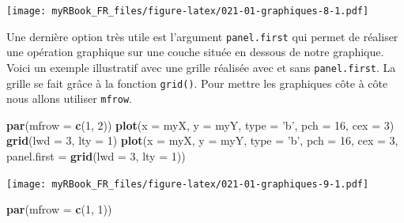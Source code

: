\documentclass[]{book}
\newenvironment{Shaded}{\begin{snugshade}}{\end{snugshade}}
\newcommand{\DataTypeTok}[1]{\textcolor[rgb]{0.13,0.29,0.53}{#1}}
\newcommand{\DecValTok}[1]{\textcolor[rgb]{0.00,0.00,0.81}{#1}}
\newcommand{\KeywordTok}[1]{\textcolor[rgb]{0.13,0.29,0.53}{\textbf{#1}}}
\newcommand{\NormalTok}[1]{#1}
\newcommand{\StringTok}[1]{\textcolor[rgb]{0.31,0.60,0.02}{#1}}
\begin{document}
\texttt{[image: myRBook\_FR\_files/figure-latex/021-01-graphiques-8-1.pdf]}

Une dernière option très utile est l'argument \texttt{panel.first} qui permet de réaliser une opération graphique sur une couche située en dessous de notre graphique. Voici un exemple illustratif avec une grille réalisée avec et sans \texttt{panel.first}. La grille se fait grâce à la fonction \texttt{grid()}. Pour mettre les graphiques côte à côte nous allons utiliser \texttt{mfrow}.

\begin{Shaded}
\begin{Highlighting}[]
\KeywordTok{par}\NormalTok{(}\DataTypeTok{mfrow =} \KeywordTok{c}\NormalTok{(}\DecValTok{1}\NormalTok{, }\DecValTok{2}\NormalTok{))}
\KeywordTok{plot}\NormalTok{(}\DataTypeTok{x =}\NormalTok{ myX, }\DataTypeTok{y =}\NormalTok{ myY, }
  \DataTypeTok{type =} \StringTok{'b'}\NormalTok{, }\DataTypeTok{pch =} \DecValTok{16}\NormalTok{, }\DataTypeTok{cex =} \DecValTok{3}\NormalTok{) }
\KeywordTok{grid}\NormalTok{(}\DataTypeTok{lwd =} \DecValTok{3}\NormalTok{, }\DataTypeTok{lty =} \DecValTok{1}\NormalTok{)}
\KeywordTok{plot}\NormalTok{(}\DataTypeTok{x =}\NormalTok{ myX, }\DataTypeTok{y =}\NormalTok{ myY, }
  \DataTypeTok{type =} \StringTok{'b'}\NormalTok{, }\DataTypeTok{pch =} \DecValTok{16}\NormalTok{, }\DataTypeTok{cex =} \DecValTok{3}\NormalTok{, }
  \DataTypeTok{panel.first =} \KeywordTok{grid}\NormalTok{(}\DataTypeTok{lwd =} \DecValTok{3}\NormalTok{, }\DataTypeTok{lty =} \DecValTok{1}\NormalTok{)) }
\end{Highlighting}
\end{Shaded}

\texttt{[image: myRBook\_FR\_files/figure-latex/021-01-graphiques-9-1.pdf]}

\begin{Shaded}
\begin{Highlighting}[]
\KeywordTok{par}\NormalTok{(}\DataTypeTok{mfrow =} \KeywordTok{c}\NormalTok{(}\DecValTok{1}\NormalTok{, }\DecValTok{1}\NormalTok{))}
\end{Highlighting}
\end{Shaded}
\end{document}
